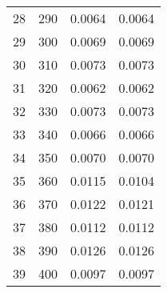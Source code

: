 \begin{table}
\begin{adjustbox}{width=1\textwidth/2}
\begin{tabular}{|c|c|c|c|}
\cline{1-4}
28 & 290 & 0.0064 & 0.0064 \\
\cline{1-4}
29 & 300 & 0.0069 & 0.0069 \\
\cline{1-4}
30 & 310 & 0.0073 & 0.0073 \\
\cline{1-4}
31 & 320 & 0.0062 & 0.0062 \\
\cline{1-4}
32 & 330 & 0.0073 & 0.0073 \\
\cline{1-4}
33 & 340 & 0.0066 & 0.0066 \\
\cline{1-4}
34 & 350 & 0.0070 & 0.0070 \\
\cline{1-4}
35 & 360 & 0.0115 & 0.0104 \\
\cline{1-4}
36 & 370 & 0.0122 & 0.0121 \\
\cline{1-4}
37 & 380 & 0.0112 & 0.0112 \\
\cline{1-4}
38 & 390 & 0.0126 & 0.0126 \\
\cline{1-4}
39 & 400 & 0.0097 & 0.0097 \\
\cline{1-4}
\end{tabular}
\end{adjustbox}
\end{table}

